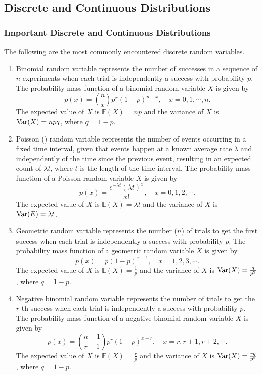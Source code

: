 \documentclass[12pt,letterpaper, onecolumn]{exam}
\begin{document}
\subsection{Discrete and Continuous Distributions}
\subsubsection{Important Discrete and Continuous Distributions}
\indent\quad The following are the most commonly encountered discrete random variables.
\begin{enumerate}
    \item Binomial random variable represents the number of successes in a sequence of $n$ experiments when each trial is independently a success with probability $p$. The probability mass function of a binomial random variable $X$ is given by
    $$p(x)=\binom{n}{x}p^x(1-p)^{n-x},\quad x=0,1,\cdots,n.$$
    The expected value of $X$ is $\mathbb{E}(X)=np$ and the variance of $X$ is ${\rm{Var}}(X)=npq$, where $q=1-p$.
    \item Poisson () random variable represents the number of events occurring in a fixed time interval, given that events happen at a known average rate $\lambda$ and independently of the time since the previous event, resulting in an expected count of $\lambda t$, where $t$ is the length of the time interval. The probability mass function of a Poisson random variable $X$ is given by 
    $$p(x)=\frac{e^{-\lambda t}(\lambda t)^x}{x!},\quad x=0,1,2,\cdots.$$
    The expected value of $X$ is $\mathbb{E}(X)=\lambda t$ and the variance of $X$ is ${\rm{Var}}(E)=\lambda t$.
    \item Geometric random variable represents the number ($n$) of trials to get the first success when each trial is independently a success with probability $p$. The probability mass function of a geometric random variable $X$ is given by
    $$p(x)=p(1-p)^{x-1},\quad x=1,2,3,\cdots.$$
    The expected value of $X$ is $\mathbb{E}(X)=\frac{1}{p}$ and the variance of $X$ is ${\rm{Var}}(X)=\frac{q}{p^2}$, where $q=1-p$.
    \item Negative binomial random variable represents the number of trials to get the $r$-th success when each trial is independently a success with probability $p$. The probability mass function of a negative binomial random variable $X$ is given by
    $$p(x)=\binom{n-1}{r-1}p^r(1-p)^{x-r},\quad x=r,r+1,r+2,\cdots.$$
    The expected value of $X$ is $\mathbb{E}(X)=\frac{r}{p}$ and the variance of $X$ is ${\rm{Var}}(X)=\frac{rq}{p^2}$, where $q=1-p$.
\end{enumerate}
\end{document}

